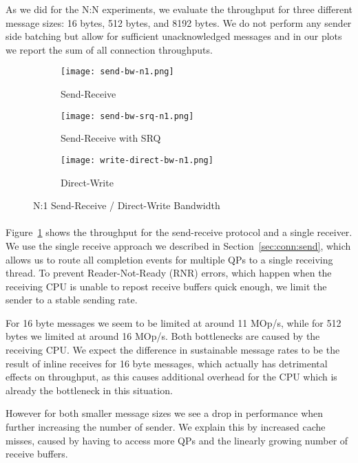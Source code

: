 As we did for the N:N experiments, we evaluate the throughput for three different message sizes: 16 bytes, 
512 bytes, and 8192 bytes. We do not perform any sender side batching but allow for sufficient unacknowledged messages 
and in our plots we report the sum of all connection throughputs.


\begin{figure}[ht]
  \centering
\begin{subfigure}[b]{0.49\textwidth}
  \centering
  \texttt{[image: send-bw-n1.png]}
  \caption{Send-Receive}
  \label{fig:plot-sndrcv-bw-n1-nosrq}
\end{subfigure}
\begin{subfigure}[b]{0.49\textwidth}
  \centering
  \texttt{[image: send-bw-srq-n1.png]}
  \caption{Send-Receive with SRQ}
  \label{fig:plot-sndrcv-bw-n1-srq}
\end{subfigure}
  \begin{subfigure}[b]{0.48\textwidth}
  \centering
  \texttt{[image: write-direct-bw-n1.png]}
  \caption{Direct-Write}
  \label{fig:plot-wdir-bw-n1}
  \end{subfigure}
\caption{N:1 Send-Receive / Direct-Write Bandwidth}
  \label{fig:plot-sndrcv-bw-n1}
\end{figure}



\paragraph{} Figure~\ref{fig:plot-sndrcv-bw-n1-nosrq} shows the throughput for the send-receive protocol and a single receiver. We
use the single receive approach we described in Section~\ref{sec:conn:send}, which allows us to route all completion events for 
multiple QPs to a single receiving thread. To prevent Reader-Not-Ready (RNR) errors, which happen when the receiving CPU is 
unable to repost receive buffers quick enough, we limit the sender to a stable sending rate.

For 16 byte messages we seem to be limited at around 11 MOp/s, while for 512 bytes we limited at around 16 MOp/s. Both bottlenecks
are caused by the receiving CPU. We expect the difference in sustainable message rates to be the result of inline receives for 
16 byte messages, which actually has detrimental effects on throughput, as this causes additional overhead for the CPU which 
is already the bottleneck in this situation.

However for both smaller message sizes we see a drop in performance when further increasing the number of sender. We explain 
this by increased cache misses, caused by having to access more QPs and the linearly growing number of receive buffers.

